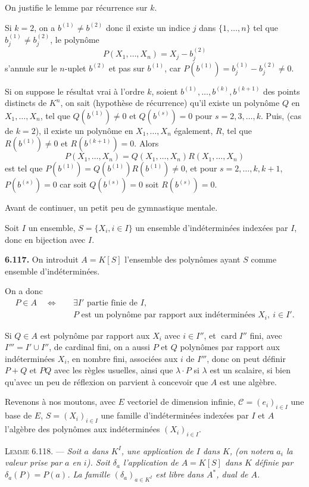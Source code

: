 On justifie le lemme par récurrence sur $k$.

Si $k=2$, on a $b^{(1)}\ne b^{(2)}$ donc il existe un indice $j$ dans $\{1,\ldots,n\}$ tel que $b_j^{(1)}\ne b_j^{(2)}$, le polynôme
\[
P(X_1,\ldots,X_n)=X_j-b_j^{(2)}
\]
s'annule sur le $n$-uplet $b^{(2)}$ et pas sur $b^{(1)}$, car $P(b^{(1)})=b_j^{(1)}-b_j^{(2)}\ne0$.

Si on suppose le résultat vrai à l'ordre $k$, soient $b^{(1)},\ldots,b^{(k)},b^{(k+1)}$ des points distincts de $K^n$, on sait (hypothèse de récurrence) qu'il existe un polynôme $Q$ en $X_1,\ldots,X_n$, tel que $Q(b^{(1)})\ne0$ et $Q(b^{(s)})=0$ pour $s=2,3,\ldots,k$. Puis, (cas de $k=2$), il existe un polynôme en $X_1,\ldots,X_n$ également, $R$, tel que $R(b^{(1)})\ne0$ et $R(b^{(k+1)})=0$. Alors
\[
P(X_1,\ldots,X_n)=Q(X_1,\ldots,X_n)R(X_1,\ldots,X_n)
\]
est tel que $P(b^{(1)})=Q(b^{(1)})R(b^{(1)})\ne0$, et pour $s=2,\ldots,k,k+1$, $P(b^{(s)})=0$ car soit $Q(b^{(s)})=0$ soit $R(b^{(s)})=0$. \bookend

Avant de continuer, un petit peu de gymnastique mentale.

Soit $I$ un ensemble, $S=\{X_i,i\in I\}$ un ensemble d'indéterminées indexées par $I$, donc en bijection avec $I$.

\medskip\noindent\textbf{6.117.} On introduit $A=K[S]$ l'ensemble des polynômes ayant $S$ comme ensemble d'indéterminées.

On a donc
\[
\begin{aligned}
P\in A\quad\Longleftrightarrow\quad &\exists I'\text{ partie finie de }I,\\
& P\text{ est un polynôme par rapport aux indéterminées }X_i,\ i\in I'.
\end{aligned}
\]

Si $Q\in A$ est polynôme par rapport aux $X_i$ avec $i\in I''$, et $\operatorname{card}I''$ fini, avec $I'''=I'\cup I''$, de cardinal fini, on a aussi $P$ et $Q$ polynômes par rapport aux indéterminées $X_i$, en nombre fini, associées aux $i$ de $I'''$, donc on peut définir $P+Q$ et $PQ$ avec les règles usuelles, ainsi que $\lambda\cdot P$ si $\lambda$ est un scalaire, si bien qu'avec un peu de réflexion on parvient à concevoir que $A$ est une algèbre.

Revenons à nos moutons, avec $E$ vectoriel de dimension infinie, $\mathcal C=(e_i)_{i\in I}$ une base de $E$, $S=(X_i)_{i\in I}$ une famille d'indéterminées indexées par $I$ et $A$ l'algèbre des polynômes aux indéterminées $(X_i)_{i\in I}$.

\medskip\noindent\textsc{Lemme 6.118.} --- \emph{Soit $a$ dans $K^I$, une application de $I$ dans $K$, (on notera $a_i$ la valeur prise par $a$ en $i$). Soit $\delta_a$ l'application de $A=K[S]$ dans $K$ définie par $\delta_a(P)=P(a)$. La famille $(\delta_a)_{a\in K^I}$ est libre dans $A^*$, dual de $A$.}

